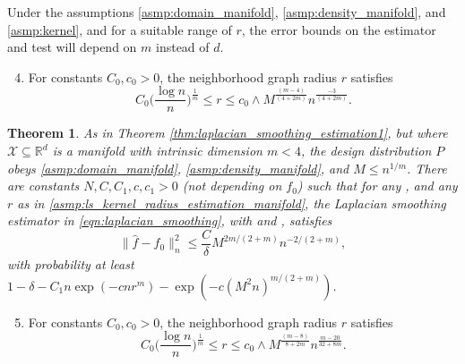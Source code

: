 \documentclass[twoside]{article}
\newcommand{\Reals}{\mathbb{R}}
\newcommand{\1}{\mathbf{1}}
\newcommand{\Rd}{\Reals^d}
\newcommand{\Xset}{\mathcal{X}}
\newcommand{\wh}[1]{\widehat{#1}}
\newtheorem{theorem}{Theorem}
\theoremstyle{definition}
\theoremstyle{remark}
\begin{document}
Under the assumptions \ref{asmp:domain_manifold}, \ref{asmp:density_manifold}, and \ref{asmp:kernel}, and for a suitable range of $r$, the error bounds on the estimator \smash{$\wh{f}$} and test \smash{$\wh{\varphi}$} will depend on $m$ instead of $d$. 
\begin{enumerate}[label=(R\arabic*)]
	\setcounter{enumi}{3}
	\item 
	\label{asmp:ls_kernel_radius_estimation_manifold}
	For constants $C_0,c_0>0$, the neighborhood graph radius $r$ satisfies 
	\begin{equation*}
	C_0\biggl(\frac{\log n}{n}\biggr)^{\frac{1}{m}} \leq r \leq c_0 \wedge  M^{\frac{(m - 4)}{(4 + 2m)}} n^{\frac{-3}{(4 + 2m)}}.
	\end{equation*}
\end{enumerate}

\begin{theorem}
	\label{thm:laplacian_smoothing_estimation_manifold}
  As in Theorem \ref{thm:laplacian_smoothing_estimation1}, but where $\Xset \subseteq \Rd$ is a manifold with intrinsic dimension $m < 4$, the design distribution $P$ obeys \ref{asmp:domain_manifold}, \ref{asmp:density_manifold}, and $M \leq n^{1/m}$. There are constants $N,C,C_1,c,c_1>0$ (not depending on $f_0$) such that for any , and any $r$ as in \ref{asmp:ls_kernel_radius_estimation_manifold}, the Laplacian smoothing estimator \smash{$\wh{f}$} in \eqref{eqn:laplacian_smoothing}, with  and , satisfies
	\begin{equation*}
	\bigl\|\wh{f} - f_0\bigr\|_n^2 \leq \frac{C}{\delta} M^{2m/(2 + m)} n^{-2/(2 + m)},
	\end{equation*}
  with probability at least $1 - \delta -  C_1 n\exp(-cnr^m) - \exp(-c(M^2n)^{m/(2+m)})$.
\end{theorem}

\begin{enumerate}[label=(R\arabic*)]
	\setcounter{enumi}{4}
	\item 
	\label{asmp:ls_kernel_radius_testing_manifold}
	For constants $C_0,c_0>0$, the neighborhood graph radius $r$ satisfies 
	\begin{equation*}
	C_0\biggl(\frac{\log n}{n}\biggr)^{\frac{1}{m}} \leq r \leq c_0 \wedge M^{\frac{(m - 8)}{8 + 2m}} n^{\frac{m - 20}{32 + 8m}}.
	\end{equation*}
\end{enumerate}
\end{document}
